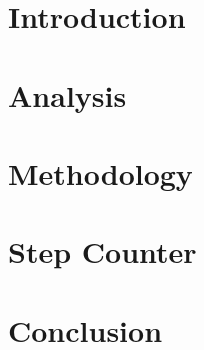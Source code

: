 



\frontmatter 

\cleardoublepage

\cleardoublepage

\cleardoublepage

\setlength\parskip{0ex} %
\tableofcontents* %
\setlength{\parskip}{3mm} %


\mainmatter
{} %
\pagestyle{custom}

\chapter{Introduction}
\label{chap:intro}


\chapter{Analysis}
\label{chap:analysis}


\chapter{Methodology}
\label{chap:methodology}


\chapter{Step Counter}
\label{chap:stepCounter}


\chapter{Conclusion}
\label{chap:conclusion}




